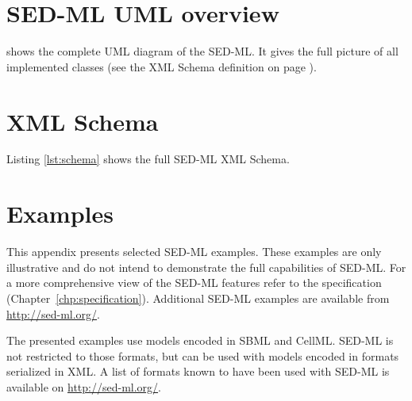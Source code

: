 \documentclass[pdftex,rgb,dvipsnames,svgnames,hyperref,table]{report}
\begin{document}
\appendix
\chapter{SED-ML UML overview}
\label{app:uml}
 shows the complete UML diagram of the SED-ML. It gives the full picture of all implemented classes (see the XML Schema definition on page \pageref{lst:schema}).


\chapter{XML Schema}
\label{app:schema}
Listing \ref{lst:schema} shows the full SED-ML XML Schema.

\chapter{Examples}
\label{app:examples}
This appendix presents selected SED-ML examples. These examples are only illustrative and do not intend to demonstrate the full capabilities of SED-ML. For a more comprehensive view of the SED-ML features refer to the specification (Chapter~\ref{chp:specification}). Additional SED-ML examples are available from \url{http://sed-ml.org/}.

The presented examples use models encoded in SBML and CellML. SED-ML is not restricted to those formats, but can be used with models encoded in formats serialized in XML. A list of formats known to have been used with SED-ML is available on \url{http://sed-ml.org/}.









\end{document}
